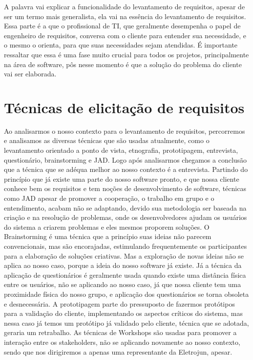 A palavra vai explicar a funcionalidade do levantamento de requisitos, apesar de ser um termo mais generalista, ela vai na essência do levantamento de requisitos.
Essa parte é a que o profissional de TI, que geralmente desempenha o papel de engenheiro de requisitos, conversa com o cliente para entender sua necessidade, e o mesmo o orienta, para que suas necessidades sejam atendidas.
É importante ressaltar que essa é uma fase muito crucial para todos os projetos, principalmente na área de software, pôs nesse momento é que a solução do problema do cliente vai ser elaborada.

\section {Técnicas de elicitação de requisitos}

Ao analisarmos o nosso contexto para o levantamento de requisitos, percorremos e analisamos as diversas técnicas que são usadas atualmente, como o levantamento orientado a ponto de vista, etnografia, prototipagem, entrevista, questionário, brainstorming e JAD. Logo após analisarmos chegamos a conclusão que a técnica que se adéqua melhor ao nosso contexto é a entrevista.
Partindo do princípio que já existe uma parte do nosso software pronto, e que nossa cliente conhece bem os requisitos e tem noções de desenvolvimento de software, técnicas como JAD apesar de promover a cooperação, o trabalho em grupo e o entendimento, acabam não se adaptando, devido sua metodologia ser baseada na criação e na resolução de problemas, onde os desenvolvedores ajudam os usuários do sistema a criarem problemas e eles mesmos proporem soluções.
O Brainstorming é uma técnica que a princípio suas ideias não parecem convencionais, mas são encorajadas, estimulando frequentemente os participantes para a elaboração de soluções criativas. Mas a exploração de novas ideias não se aplica ao nosso caso, porque a ideia do nosso software já existe.
Já a técnica da aplicação de questionários é geralmente usada quando existe uma distância física entre os usuários, não se aplicando ao nosso caso, já que nossa cliente tem uma proximidade física do nosso grupo, e aplicação dos questionários se torna obsoleta e desnecessária.
A prototipagem parte do pressuposto de fazermos protótipos para a validação do cliente, implementando os aspectos críticos do sistema, mas nessa caso já temos um protótipo já validado pelo cliente, técnica que se adotada, geraria um retrabalho.
As técnicas de Workshops são usadas para promover a interação entre os stakeholders, não se aplicando novamente ao nosso contexto, sendo que nos dirigiremos a apenas uma representante da Eletrojun, apesar.

